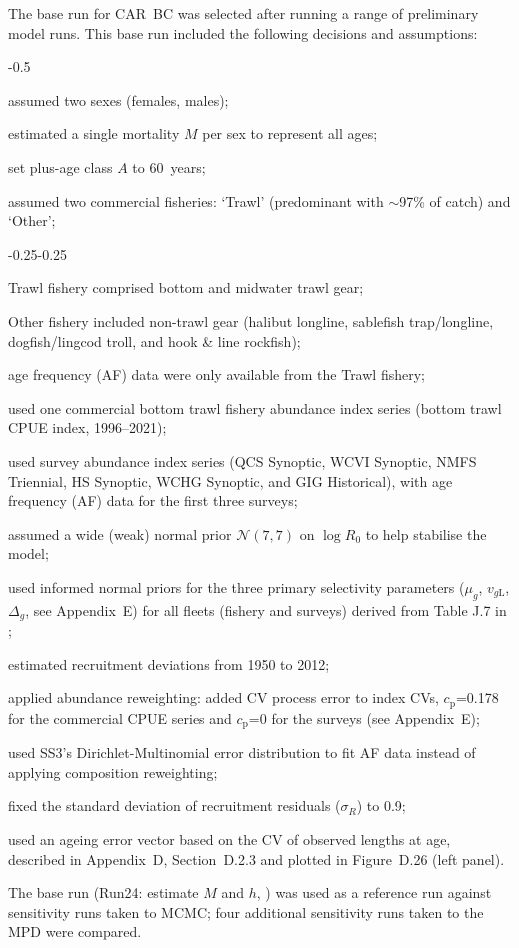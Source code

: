 \documentclass[11pt]{book}
\newcommand{\AppBio}{Appendix~D}
\newcommand{\AppEqn}{Appendix~E}
\newcommand{\pc}{\%}
\begin{document}
The base run for CAR~BC was selected after running a range of preliminary model runs.
This base run included the following decisions and assumptions:
\begin{itemize_csas}{-0.5}{}
  \item assumed two sexes (females, males);
  \item estimated a single mortality $M$ per sex to represent all ages;
  \item set plus-age class $A$ to 60~years;
  \item assumed two commercial fisheries: `Trawl' (predominant with $\sim$97\pc{} of catch) and `Other';
  \begin{itemize_csas}{-0.25}{-0.25}
    \item Trawl fishery comprised bottom and midwater trawl gear;
    \item Other fishery included non-trawl gear (halibut longline, sablefish trap/longline, dogfish/lingcod troll, and hook \& line rockfish);
    \item age frequency (AF) data were only available from the Trawl fishery;
  \end{itemize_csas}
  \item used one commercial bottom trawl fishery abundance index series (bottom trawl CPUE index, 1996--2021);
  \item used  survey abundance index series (QCS Synoptic, WCVI Synoptic, NMFS Triennial, HS Synoptic, WCHG Synoptic, and GIG Historical), with age frequency (AF) data for the first three surveys;
  \item assumed a wide (weak) normal prior $\mathcal{N}(7,7)$ on $\log R_0$ to help stabilise the model; 
  \item used informed normal priors for the three primary selectivity parameters ($\mu_g$, $v_{g\text{L}}$, $\Delta_{g}$, see \AppEqn) for all fleets (fishery and surveys) derived from Table J.7 in \citet{Stanley-etal:2009_car};
  \item estimated recruitment deviations from 1950 to 2012;
  \item applied abundance reweighting: added CV process error to index CVs, $c_\text{p}$=0.178 for the commercial CPUE series and $c_\text{p}$=0 for the surveys (see \AppEqn);
  \item used SS3's Dirichlet-Multinomial error distribution to fit AF data instead of applying composition reweighting;
  \item fixed the standard deviation of recruitment residuals ($\sigma_R$) to 0.9;
  \item used an ageing error vector based on the CV of observed lengths at age, described in \AppBio, Section~D.2.3 and plotted in Figure~D.26 (left panel).
\end{itemize_csas}
The base run (Run24: estimate $M$ and $h$, ) was used as a reference run against  sensitivity runs taken to MCMC; four additional sensitivity runs taken to the MPD were compared.
\end{document}
